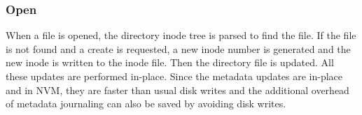 \subsubsection{Open}
When a file is opened, the directory inode tree is parsed to find the file. If the file is not found and a create is requested, a new inode number is generated and the new inode is written to the inode file. Then the directory file is updated. All these updates are performed in-place. Since the metadata updates are in-place and in NVM, they are faster than usual disk writes and the additional overhead of metadata journaling can also be saved by avoiding disk writes.

